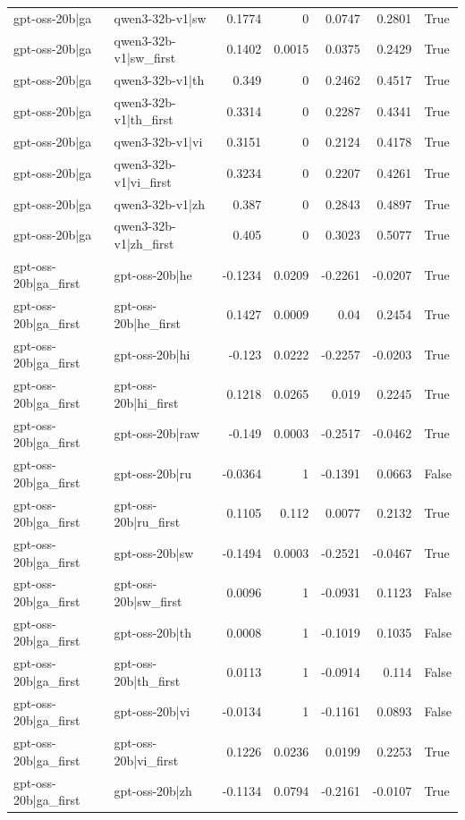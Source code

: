 \begin{table}
\begin{tabular}{l l r r r r l}
gpt-oss-20b|ga & qwen3-32b-v1|sw & 0.1774 & 0 & 0.0747 & 0.2801 & True \\
gpt-oss-20b|ga & qwen3-32b-v1|sw_first & 0.1402 & 0.0015 & 0.0375 & 0.2429 & True \\
gpt-oss-20b|ga & qwen3-32b-v1|th & 0.349 & 0 & 0.2462 & 0.4517 & True \\
gpt-oss-20b|ga & qwen3-32b-v1|th_first & 0.3314 & 0 & 0.2287 & 0.4341 & True \\
gpt-oss-20b|ga & qwen3-32b-v1|vi & 0.3151 & 0 & 0.2124 & 0.4178 & True \\
gpt-oss-20b|ga & qwen3-32b-v1|vi_first & 0.3234 & 0 & 0.2207 & 0.4261 & True \\
gpt-oss-20b|ga & qwen3-32b-v1|zh & 0.387 & 0 & 0.2843 & 0.4897 & True \\
gpt-oss-20b|ga & qwen3-32b-v1|zh_first & 0.405 & 0 & 0.3023 & 0.5077 & True \\
gpt-oss-20b|ga_first & gpt-oss-20b|he & -0.1234 & 0.0209 & -0.2261 & -0.0207 & True \\
gpt-oss-20b|ga_first & gpt-oss-20b|he_first & 0.1427 & 0.0009 & 0.04 & 0.2454 & True \\
gpt-oss-20b|ga_first & gpt-oss-20b|hi & -0.123 & 0.0222 & -0.2257 & -0.0203 & True \\
gpt-oss-20b|ga_first & gpt-oss-20b|hi_first & 0.1218 & 0.0265 & 0.019 & 0.2245 & True \\
gpt-oss-20b|ga_first & gpt-oss-20b|raw & -0.149 & 0.0003 & -0.2517 & -0.0462 & True \\
gpt-oss-20b|ga_first & gpt-oss-20b|ru & -0.0364 & 1 & -0.1391 & 0.0663 & False \\
gpt-oss-20b|ga_first & gpt-oss-20b|ru_first & 0.1105 & 0.112 & 0.0077 & 0.2132 & True \\
gpt-oss-20b|ga_first & gpt-oss-20b|sw & -0.1494 & 0.0003 & -0.2521 & -0.0467 & True \\
gpt-oss-20b|ga_first & gpt-oss-20b|sw_first & 0.0096 & 1 & -0.0931 & 0.1123 & False \\
gpt-oss-20b|ga_first & gpt-oss-20b|th & 0.0008 & 1 & -0.1019 & 0.1035 & False \\
gpt-oss-20b|ga_first & gpt-oss-20b|th_first & 0.0113 & 1 & -0.0914 & 0.114 & False \\
gpt-oss-20b|ga_first & gpt-oss-20b|vi & -0.0134 & 1 & -0.1161 & 0.0893 & False \\
gpt-oss-20b|ga_first & gpt-oss-20b|vi_first & 0.1226 & 0.0236 & 0.0199 & 0.2253 & True \\
gpt-oss-20b|ga_first & gpt-oss-20b|zh & -0.1134 & 0.0794 & -0.2161 & -0.0107 & True \\

\end{tabular}
\end{table}
